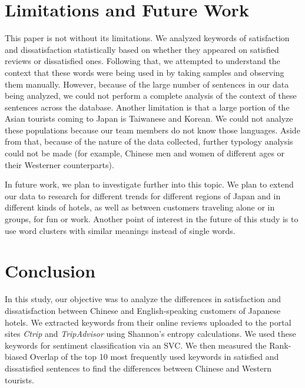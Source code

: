\documentclass[smallextended,natbib]{svjour3}       %
\begin{document}
  \section{Limitations and Future Work}\label{limitations}

    This paper is not without its limitations. We analyzed keywords of satisfaction and dissatisfaction statistically based on whether they appeared on satisfied reviews or dissatisfied ones. Following that, we attempted to understand the context that these words were being used in by taking samples and observing them manually. However, because of the large number of sentences in our data being analyzed, we could not perform a complete analysis of the context of these sentences across the database. Another limitation is that a large portion of the Asian tourists coming to Japan is Taiwanese and Korean. We could not analyze these populations because our team members do not know those languages. Aside from that, because of the nature of the data collected, further typology analysis could not be made (for example, Chinese men and women of different ages or their Westerner counterparts).

    In future work, we plan to investigate further into this topic. We plan to extend our data to research for different trends for different regions of Japan and in different kinds of hotels, as well as between customers traveling alone or in groups, for fun or work. Another point of interest in the future of this study is to use word clusters with similar meanings instead of single words. 

  \section{Conclusion}\label{conclusion}

    In this study, our objective was to analyze the differences in satisfaction and dissatisfaction between Chinese and English-speaking customers of Japanese hotels. We extracted keywords from their online reviews uploaded to the portal sites \textit{Ctrip} and \textit{TripAdvisor} using Shannon's entropy calculations. We used these keywords for sentiment classification via an SVC. We then measured the Rank-biased Overlap of the top 10 most frequently used keywords in satisfied and dissatisfied sentences to find the differences between Chinese and Western tourists. 
\end{document}
